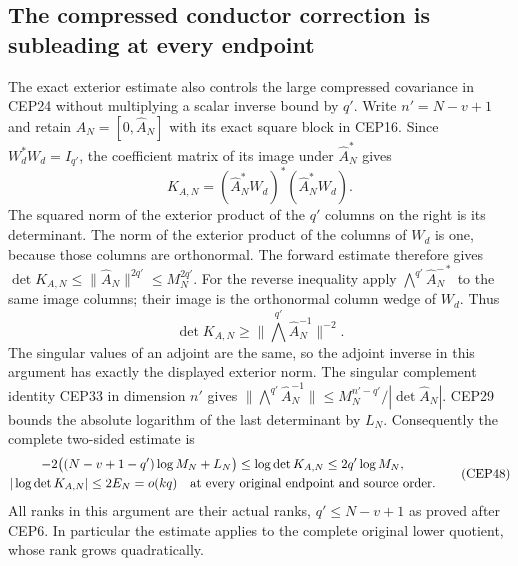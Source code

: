 \documentclass[11pt,a4paper]{article}
\begin{document}
\subsection{The compressed conductor correction is subleading at every endpoint}

The exact exterior estimate also controls the large compressed
covariance in CEP24 without multiplying a scalar inverse bound
by $q'$. Write $n'=N-v+1$ and retain
$A_N=[0,\widehat A_N]$ with its exact square block in CEP16.
Since $W_d^*W_d=I_{q'}$, the coefficient matrix of its image under
$\widehat A_N^*$ gives
\[
 K_{A,N}
   =(\widehat A_N^*W_d)^*(\widehat A_N^*W_d).
 \tag{CEP46}
\]
The squared norm of the exterior product of the $q'$ columns
on the right is its determinant. The norm of the exterior
product of the columns of $W_d$ is one, because those columns
are orthonormal. The forward estimate therefore gives
$\det K_{A,N}\le\|\widehat A_N\|^{2q'}\le M_N^{2q'}$.
For the reverse inequality apply
$\bigwedge^{q'}\widehat A_N^{-*}$ to the same image columns;
their image is the orthonormal column wedge of $W_d$. Thus
\[
 \det K_{A,N}\ge
      \|\bigwedge^{q'}\widehat A_N^{-1}\|^{-2}.
 \tag{CEP47}
\]
The singular values of an adjoint are the same, so the adjoint
inverse in this argument has exactly the displayed exterior norm.
The singular complement identity CEP33 in dimension $n'$
gives
$\|\bigwedge^{q'}\widehat A_N^{-1}\|
 \le M_N^{n'-q'}/|\det\widehat A_N|$.
CEP29 bounds the absolute logarithm of the last determinant
by $L_N$. Consequently the complete two-sided estimate is
\[
 \begin{gathered}
 -2\bigl((N-v+1-q')\log M_N+L_N\bigr)
       \le\log\det K_{A,N}\le2q'\log M_N,\\
 |\log\det K_{A,N}|\le2E_N=o(kq)
 \quad\hbox{at every original endpoint and source order.}
 \end{gathered}\tag{CEP48}
\]
All ranks in this argument are their actual ranks,
$q'\le N-v+1$ as proved after CEP6. In particular the estimate
applies to the complete original lower quotient, whose rank
grows quadratically.
\end{document}
